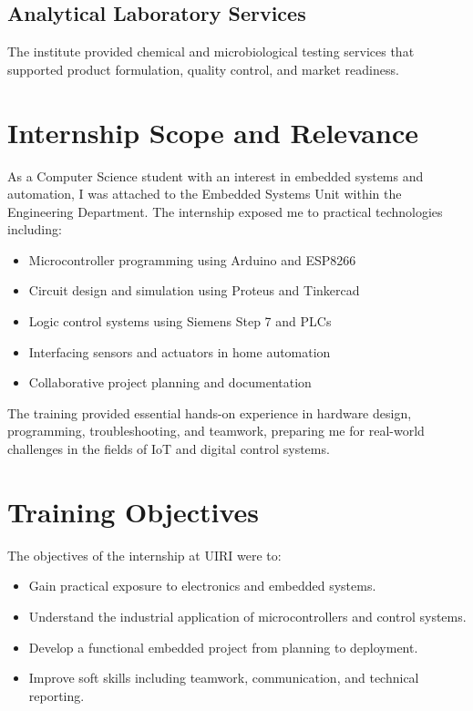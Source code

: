 \documentclass[12pt,a4paper]{report}
\begin{document}
\subsection{Analytical Laboratory Services}
\noindent The institute provided chemical and microbiological testing services that supported product formulation, quality control, and market readiness.

\section{Internship Scope and Relevance}
\noindent As a Computer Science student with an interest in embedded systems and automation, I was attached to the Embedded Systems Unit within the Engineering Department. The internship exposed me to practical technologies including:
\begin{itemize}
    \item Microcontroller programming using Arduino and ESP8266
    \item Circuit design and simulation using Proteus and Tinkercad
    \item Logic control systems using Siemens Step 7 and PLCs
    \item Interfacing sensors and actuators in home automation
    \item Collaborative project planning and documentation
\end{itemize}

\noindent The training provided essential hands-on experience in hardware design, programming, troubleshooting, and teamwork, preparing me for real-world challenges in the fields of IoT and digital control systems.

\section{Training Objectives}
\noindent The objectives of the internship at UIRI were to:
\begin{itemize}
    \item Gain practical exposure to electronics and embedded systems.
    \item Understand the industrial application of microcontrollers and control systems.
    \item Develop a functional embedded project from planning to deployment.
    \item Improve soft skills including teamwork, communication, and technical reporting.
\end{itemize}
\end{document}
